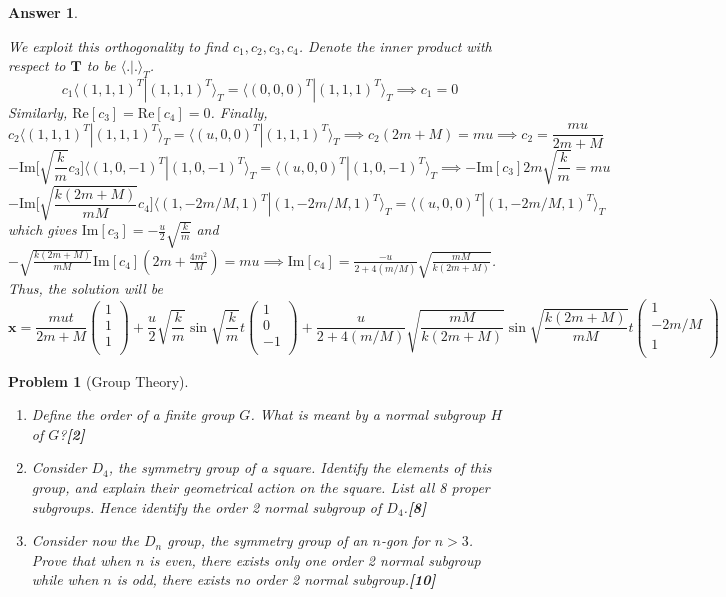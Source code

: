 \documentclass[a4paper]{article}
\newtheorem{ans}{Answer}[section]
\theoremstyle{new}
\newtheorem{qns}{Problem}[section]
\begin{document}
\begin{ans}
\begin{enumerate}[label=(\roman*)]
We exploit this orthogonality to find $c_1,c_2,c_3,c_4$. Denote the inner product with respect to $\mathbf{T}$ to be $\langle.|.\rangle_T$.
$$c_1\langle (1,1,1)^T|(1,1,1)^T\rangle_T=\langle(0,0,0)^T|(1,1,1)^T\rangle_T\implies c_1=0$$
Similarly, $\text{Re}[c_3]=\text{Re}[c_4]=0$. Finally,
$$c_2\langle (1,1,1)^T|(1,1,1)^T\rangle_T=\langle(u,0,0)^T|(1,1,1)^T\rangle_T\implies c_2(2m+M)=mu\implies c_2=\frac{mu}{2m+M}$$
$$-\text{Im}\bigg[\sqrt{\frac{k}{m}}c_3\bigg]\langle (1,0,-1)^T|(1,0,-1)^T\rangle_T=\langle(u,0,0)^T|(1,0,-1)^T\rangle_T\implies -\text{Im}[c_3]2m\sqrt{\frac{k}{m}}=mu$$
$$-\text{Im}\bigg[\sqrt{\frac{k(2m+M)}{mM}}c_4\bigg]\langle (1,-2m/M,1)^T|(1,-2m/M,1)^T\rangle_T=\langle(u,0,0)^T|(1,-2m/M,1)^T\rangle_T$$
which gives $\text{Im}[c_3]=-\frac{u}{2}\sqrt{\frac{k}{m}}$ and $-\sqrt{\frac{k(2m+M)}{mM}}\text{Im}[c_4](2m+\frac{4m^2}{M})=mu\implies \text{Im}[c_4]=\frac{-u}{2+4(m/M)}\sqrt{\frac{mM}{k(2m+M)}}$. Thus, the solution will be
$$\mathbf{x}=\frac{mut}{2m+M}\begin{pmatrix}1\\1\\1\\\end{pmatrix}+\frac{u}{2}\sqrt{\frac{k}{m}}\sin\sqrt{\frac{k}{m}}t\begin{pmatrix}1\\0\\-1\\\end{pmatrix}+\frac{u}{2+4(m/M)}\sqrt{\frac{mM}{k(2m+M)}}\sin\sqrt{\frac{k(2m+M)}{mM}}t\begin{pmatrix}1\\-2m/M\\1\\\end{pmatrix}$$
\end{enumerate}
\end{ans}
\begin{qns}[Group Theory]\leavevmode
\begin{enumerate}[label=(\roman*)]
\item Define the order of a finite group $G$. What is meant by a normal subgroup $H$ of $G$?\hfill\textbf{[2]}
\item Consider $D_4$, the symmetry group of a square. Identify the elements of this group, and explain their geometrical action on the square. List all 8 proper subgroups. Hence identify the order 2 normal subgroup of $D_4$.\hfill\textbf{[8]}
\item Consider now the $D_n$ group, the symmetry group of an $n$-gon for $n > 3$. Prove that when $n$ is even, there exists only one order 2 normal subgroup while when $n$ is odd, there  exists no order 2 normal subgroup.\hfill\textbf{[10]}
\end{enumerate}
\end{qns}
\end{document}

